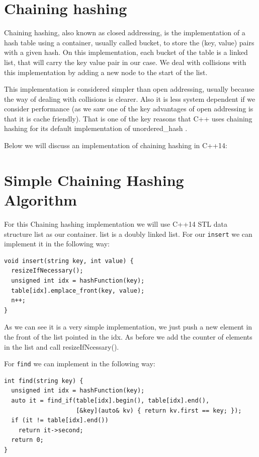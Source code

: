 \section{Chaining hashing}

Chaining hashing, also known as closed addressing, is the implementation of a hash table using a container, usually called bucket, to store the (key, value) pairs with a given hash. On this implementation, each bucket of the table is a linked list, that will carry the key value pair in our case. We deal with collisions with this implementation by adding a new node to the start of the list.

This implementation is considered simpler than open addressing, usually because the way of dealing with collisions is clearer. Also it is less system dependent if we consider performance (as we saw one of the key advantages of open addressing is that it is cache friendly). That is one of the key reasons that C++ uses chaining hashing for its default implementation of unordered\_hash \citep{HashTableProposal}.

Below we will discuss an implementation of chaining hashing in C++14:

\section{Simple Chaining Hashing Algorithm}

For this Chaining hashing implementation we will use C++14 STL data structure list as our container. list is a doubly linked list. For our \texttt{insert} we can implement it in the following way:

\begin{lstlisting}
void insert(string key, int value) {
  resizeIfNecessary();
  unsigned int idx = hashFunction(key);      
  table[idx].emplace_front(key, value);
  n++;
}
\end{lstlisting}

As we can see it is a very simple implementation, we just push a new element in the front of the list pointed in the idx. As before we add the counter of elements in the list and call resizeIfNcessary().

For \texttt{find} we can implement in the following way:

\begin{lstlisting}
int find(string key) {
  unsigned int idx = hashFunction(key);
  auto it = find_if(table[idx].begin(), table[idx].end(),
                    [&key](auto& kv) { return kv.first == key; });
  if (it != table[idx].end())
    return it->second;
  return 0;
}
\end{lstlisting}

